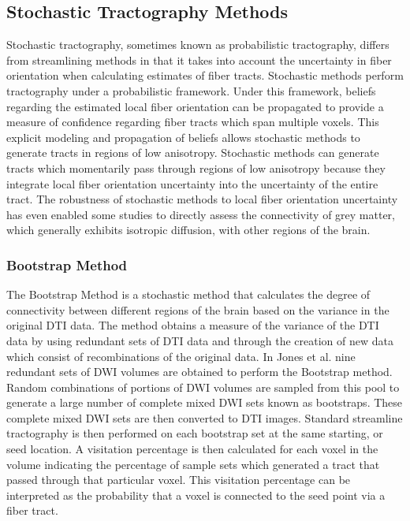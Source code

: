 \subsection{Stochastic Tractography Methods}
Stochastic tractography, sometimes known as probabilistic tractography, differs from streamlining methods in that it takes into account the uncertainty in fiber orientation when calculating estimates of fiber tracts.  Stochastic methods perform tractography under a probabilistic framework.  Under this framework, beliefs regarding the estimated local fiber orientation can be propagated to provide a measure of confidence regarding fiber tracts which span multiple voxels.  This explicit modeling and propagation of beliefs allows stochastic methods to generate tracts in regions of low anisotropy. Stochastic methods can generate tracts which momentarily pass through regions of low anisotropy because they integrate local fiber orientation uncertainty into the uncertainty of the entire tract.  The robustness of stochastic methods to local fiber orientation uncertainty has even enabled some studies to directly assess the connectivity of grey matter, which generally exhibits isotropic diffusion, with other regions of the brain\cite{behrensMRM03}.

\subsubsection{Bootstrap Method}

The Bootstrap Method is a stochastic method that calculates the degree of connectivity between different regions of the brain based on the variance in the original DTI data.  The method obtains a measure of the variance of the DTI data by using redundant sets of DTI data and through the creation of new data which consist of recombinations of the original data.  In Jones et al. \cite{derek} nine redundant sets of DWI volumes are obtained to perform the Bootstrap method.  Random combinations of portions of DWI volumes are sampled from this pool to generate a large number of complete mixed DWI sets known as bootstraps.  These complete mixed DWI sets are then converted to DTI images.  Standard streamline tractography is then performed on each bootstrap set at the same starting, or seed location.  A visitation percentage is then calculated for each voxel in the volume indicating the percentage of sample sets which generated a tract that passed through that particular voxel.  This visitation percentage can be interpreted as the probability that a voxel is connected to the seed point via a fiber tract.


